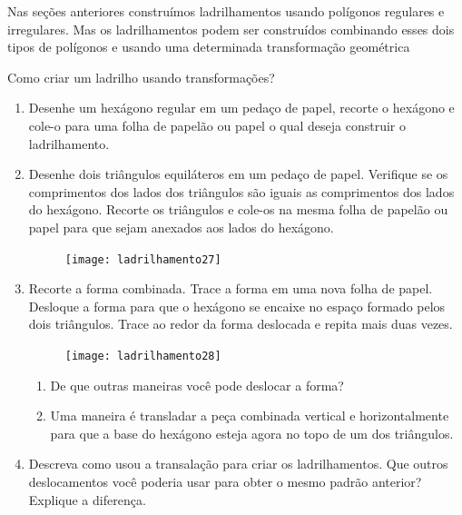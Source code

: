 
Nas seções anteriores construímos ladrilhamentos usando polígonos regulares e irregulares. Mas os ladrilhamentos podem ser construídos combinando esses dois tipos de polígonos e usando uma determinada transformação geométrica



\begin{task}{Como criar um ladrilho usando transformações?}

\begin{enumerate}
	\item Desenhe um hexágono regular em um pedaço de papel, recorte o hexágono e cole-o para uma folha de papelão ou papel o qual deseja construir o ladrilhamento.
	\item Desenhe dois triângulos equiláteros em um pedaço de papel. Verifique se os comprimentos dos lados dos triângulos são iguais as comprimentos dos lados do hexágono. Recorte os triângulos e cole-os na mesma folha de papelão ou papel para que sejam anexados aos lados do hexágono.

	\begin{figure}[H]
	\centering
	\texttt{[image: ladrilhamento27]}

	\end{figure}

	\item Recorte a forma combinada. Trace a forma em uma nova folha de papel. Desloque a forma para que o hexágono se encaixe no espaço formado pelos dois triângulos. Trace ao redor da forma deslocada e repita mais duas vezes.

	\begin{figure}[H]
	\centering
	\texttt{[image: ladrilhamento28]}

	\end{figure}
	\begin{enumerate}
		\item De que outras maneiras você pode deslocar a forma?
		\item Uma maneira é transladar a peça combinada vertical e horizontalmente para que a base do hexágono esteja agora no topo de um dos triângulos.
	\end{enumerate}
	\item Descreva como usou a transalação para criar os ladrilhamentos. Que outros deslocamentos você poderia usar para obter o mesmo padrão anterior? Explique a diferença.
\end{enumerate}
\end{task}

